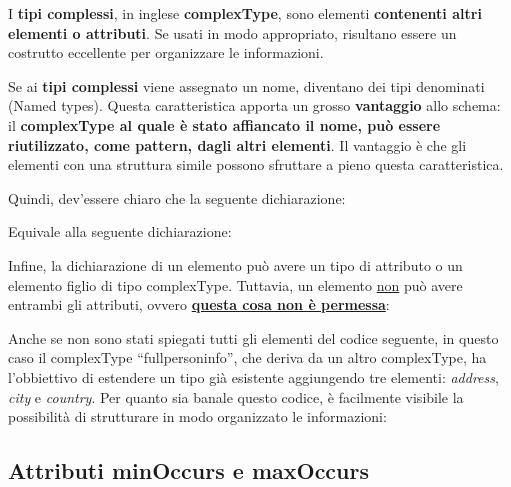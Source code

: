 \documentclass[a4paper]{article}
\newcommand{\dquotes}[1]{``#1''}
\begin{document}
	I \textcolor{Red3}{\textbf{tipi complessi}}, in inglese \textbf{\textsf{complexType}}, sono elementi \textbf{contenenti altri elementi o attributi}. Se usati in modo appropriato, risultano essere un costrutto eccellente per organizzare le informazioni.\newline
	
	\noindent
	Se ai \textbf{tipi complessi} viene assegnato un nome, diventano dei tipi denominati (Named types). Questa caratteristica apporta un grosso \textcolor{Green4}{\textbf{vantaggio}} allo schema: il \textbf{\textsf{complexType} al quale è stato affiancato il nome, può essere riutilizzato, come pattern, dagli altri elementi}. Il vantaggio è che gli elementi con una struttura simile possono sfruttare a pieno questa caratteristica.
	
	Quindi, dev'essere chiaro che la seguente dichiarazione:
	
	Equivale alla seguente dichiarazione:
	\newpage
	
	\noindent
	Infine, la dichiarazione di un elemento può avere un tipo di attributo o un elemento figlio di tipo \textsf{complexType}. Tuttavia, un elemento \underline{non} può avere entrambi gli attributi, ovvero \textbf{\underline{questa cosa non è permessa}}:
	
	Anche se non sono stati spiegati tutti gli elementi del codice seguente, in questo caso il \textsf{complexType} \dquotes{\textsf{fullpersoninfo}}, che deriva da un altro \textsf{complexType}, ha l'obbiettivo di estendere un tipo già esistente aggiungendo tre elementi: \emph{address}, \emph{city} e \emph{country}. Per quanto sia banale questo codice, è facilmente visibile la possibilità di strutturare in modo organizzato le informazioni:
	\newpage
	
	\subsection{Attributi \textsf{minOccurs} e \textsf{maxOccurs}}
	
\end{document}
